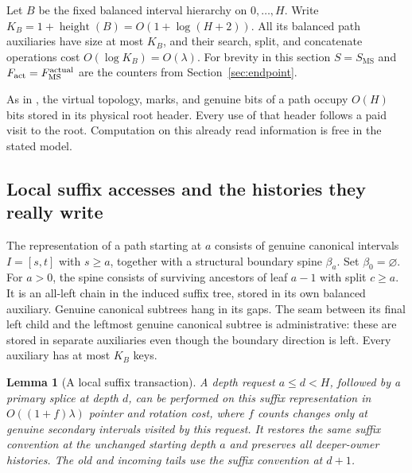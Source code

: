 \documentclass[11pt]{article}
\numberwithin{equation}{section}
\newtheorem{lemma}[theorem]{Lemma}
\newcommand{\MS}{\mathrm{MS}}
\begin{document}
Let $B$ be the fixed balanced interval hierarchy on $0,\ldots,H$.
Write $K_B=1+\operatorname{height}(B)=O(1+\log(H+2))$.
All its balanced path auxiliaries have size at most $K_B$, and their
search, split, and concatenate operations cost $O(\log K_B)=O(\lambda)$.
For brevity in this section $S=S_{\MS}$ and
$F_{\rm act}=F_{\MS}^{\rm actual}$ are the counters from
Section~\ref{sec:endpoint}.

As in \cite{ChaCha}, the virtual topology, marks, and genuine bits of
a path occupy $O(H)$ bits stored in its physical root header. Every
use of that header follows a paid visit to the root. Computation on
this already read information is free in the stated model.

\subsection{Local suffix accesses and the histories they really write}

The representation of a path starting at $a$ consists of genuine
canonical intervals $I=[s,t]$ with $s\ge a$, together with a structural
boundary spine $\beta_a$. Set $\beta_0=\varnothing$. For $a>0$,
the spine consists of surviving ancestors of leaf $a-1$ with split
$c\ge a$. It is an all-left chain in the
induced suffix tree, stored in its own balanced auxiliary. Genuine
canonical subtrees hang in its gaps. The seam between its final left
child and the leftmost genuine canonical subtree is administrative:
these are stored in separate auxiliaries even though the boundary
direction is left. Every auxiliary has at most $K_B$ keys.

\begin{lemma}[A local suffix transaction]\label{comp:lem:suffix}
A depth request $a\le d<H$, followed by a primary splice at depth $d$,
can be performed on this suffix representation in
$O((1+f)\lambda)$ pointer and rotation cost, where $f$ counts changes
only at genuine secondary intervals visited by this request. It restores
the same suffix convention at the unchanged starting depth $a$ and
preserves all deeper-owner histories. The old and incoming tails use
the suffix convention at $d+1$.
\end{lemma}
\end{document}
